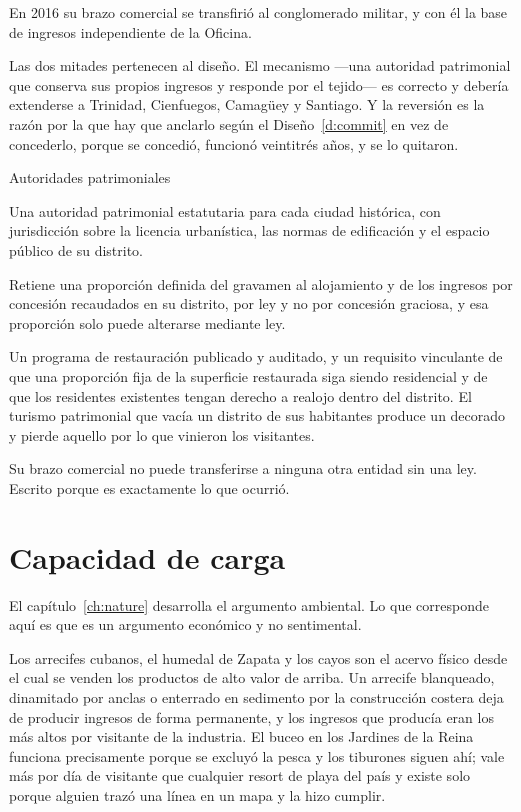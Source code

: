 En 2016 su brazo comercial se transfirió al conglomerado militar, y con él la base de
ingresos independiente de la Oficina.

Las dos mitades pertenecen al diseño. El mecanismo ---una autoridad patrimonial que
conserva sus propios ingresos y responde por el tejido--- es correcto y debería extenderse a
Trinidad, Cienfuegos, Camagüey y Santiago. Y la reversión es la razón por la que hay que
anclarlo según el Diseño~\ref{d:commit} en vez de concederlo, porque se concedió, funcionó
veintitrés años, y se lo quitaron.

\begin{design}{Autoridades patrimoniales}
\label{d:heritage}
\begin{rules}
 Una autoridad patrimonial estatutaria para cada ciudad histórica, con
jurisdicción sobre la licencia urbanística, las normas de edificación y el espacio público
de su distrito.

 Retiene una proporción definida del gravamen al alojamiento y de los
ingresos por concesión recaudados en su distrito, por ley y no por concesión graciosa, y esa
proporción solo puede alterarse mediante ley.

 Un programa de restauración publicado y auditado, y un requisito
vinculante de que una proporción fija de la superficie restaurada siga siendo residencial y
de que los residentes existentes tengan derecho a realojo dentro del distrito. El turismo
patrimonial que vacía un distrito de sus habitantes produce un decorado y pierde aquello por
lo que vinieron los visitantes.

 Su brazo comercial no puede transferirse a ninguna otra entidad sin
una ley. Escrito porque es exactamente lo que ocurrió.
\end{rules}
\end{design}

\section{Capacidad de carga}

El capítulo~\ref{ch:nature} desarrolla el argumento ambiental. Lo que corresponde aquí es
que es un argumento económico y no sentimental.

Los arrecifes cubanos, el humedal de Zapata y los cayos son el acervo físico desde el cual se
venden los productos de alto valor de arriba. Un arrecife blanqueado, dinamitado por anclas o
enterrado en sedimento por la construcción costera deja de producir ingresos de forma
permanente, y los ingresos que producía eran los más altos por visitante de la industria. El
buceo en los Jardines de la Reina funciona precisamente porque se excluyó la pesca y los
tiburones siguen ahí; vale más por día de visitante que cualquier resort de playa del país y
existe solo porque alguien trazó una línea en un mapa y la hizo cumplir.

